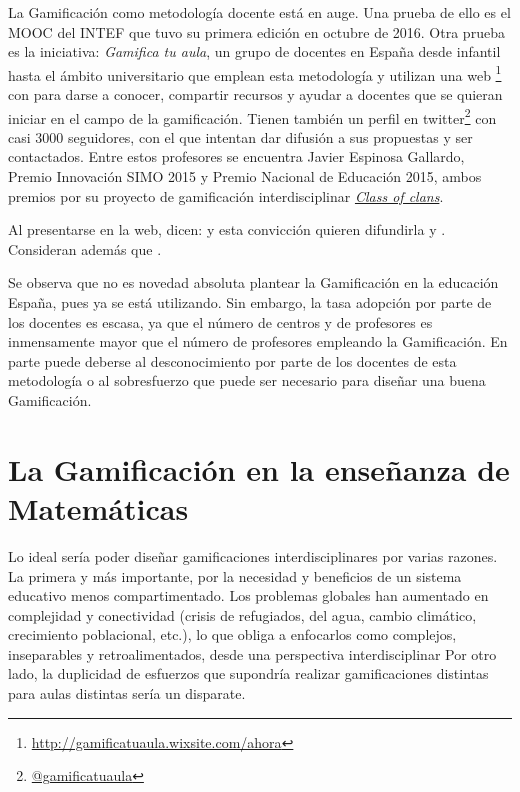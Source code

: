 La Gamificación como metodología docente está en auge. 
%
Una prueba de ello es el \gls{MOOC} del \gls{INTEF} que tuvo su primera edición en octubre de 2016.
%
Otra prueba es la iniciativa: \textit{Gamifica tu aula}, un grupo de docentes en España desde infantil hasta el ámbito universitario que emplean esta metodología y utilizan una web \footnote{\url{http://gamificatuaula.wixsite.com/ahora}} con para darse a conocer, compartir recursos y ayudar a docentes que se quieran iniciar en el campo de la gamificación.
%
Tienen también un perfil en twitter\footnote{\href{https://twitter.com/gamificatuaula}{@gamificatuaula}} con casi 3000 seguidores, con el que intentan dar difusión a sus propuestas y ser contactados.
%
Entre estos profesores se encuentra Javier Espinosa Gallardo, Premio Innovación SIMO 2015 y Premio Nacional de Educación 2015, ambos premios por su proyecto de gamificación interdisciplinar \href{http://jespinosag.wixsite.com/classofclans}{\textit{Class of clans}}.

Al presentarse en la web, dicen:
%
%
y esta convicción quieren difundirla y .
%
Consideran además que .

Se observa que no es novedad absoluta plantear la Gamificación en la educación España, pues ya se está utilizando.
%
Sin embargo, la tasa adopción por parte de los docentes es escasa, ya que el número de centros y de profesores es inmensamente mayor que el número de profesores empleando la Gamificación.
%
En parte puede deberse al desconocimiento por parte de los docentes de esta metodología o al sobresfuerzo que puede ser necesario para diseñar una buena Gamificación.

\section{La Gamificación en la enseñanza de Matemáticas}

Lo ideal sería poder diseñar gamificaciones interdisciplinares por varias razones.
%
La primera y más importante, por la necesidad y beneficios de un sistema educativo menos compartimentado. 
%
Los problemas globales han aumentado en complejidad y conectividad (crisis de refugiados, del agua, cambio climático, crecimiento poblacional, etc.), lo que obliga a enfocarlos como complejos, inseparables y retroalimentados, desde una perspectiva interdisciplinar \citep{Interdiscip}
%
Por otro lado, la duplicidad de esfuerzos que supondría realizar gamificaciones distintas para aulas distintas sería un disparate.


